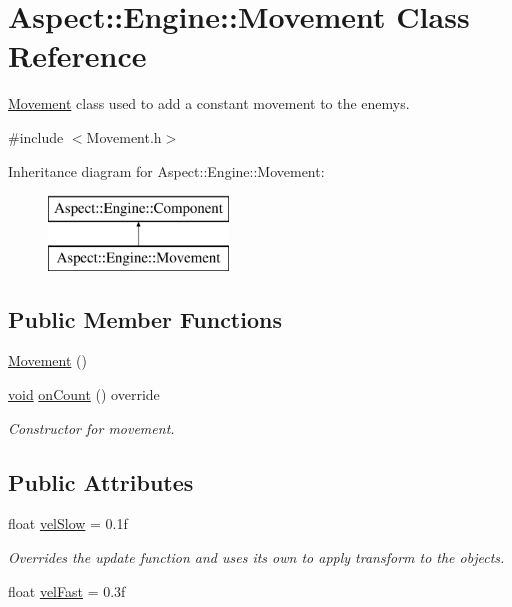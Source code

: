 \hypertarget{class_aspect_1_1_engine_1_1_movement}{}\section{Aspect\+:\+:Engine\+:\+:Movement Class Reference}
\label{class_aspect_1_1_engine_1_1_movement}


\mbox{\hyperlink{class_aspect_1_1_engine_1_1_movement}{Movement}} class used to add a constant movement to the enemys.  




{\ttfamily \#include $<$Movement.\+h$>$}

Inheritance diagram for Aspect\+:\+:Engine\+:\+:Movement\+:\begin{figure}[H]
\begin{center}
\leavevmode
\includegraphics[height=2.000000cm]{class_aspect_1_1_engine_1_1_movement}
\end{center}
\end{figure}
\subsection*{Public Member Functions}
\begin{DoxyCompactItemize}
\item 
\mbox{\hyperlink{class_aspect_1_1_engine_1_1_movement_a34fbf2e93e913d47b7f27fa51f5c312e}{Movement}} ()
\item 
\mbox{\hyperlink{_s_d_l__opengles2__gl2ext_8h_ae5d8fa23ad07c48bb609509eae494c95}{void}} \mbox{\hyperlink{class_aspect_1_1_engine_1_1_movement_a4dc9ec0157d8d24dafeb69c3c3f60e23}{on\+Count}} () override
\begin{DoxyCompactList}\small\item\em Constructor for movement. \end{DoxyCompactList}\end{DoxyCompactItemize}
\subsection*{Public Attributes}
\begin{DoxyCompactItemize}
\item 
float \mbox{\hyperlink{class_aspect_1_1_engine_1_1_movement_af7975b02666fc826c7d57193d2230c77}{vel\+Slow}} = 0.\+1f
\begin{DoxyCompactList}\small\item\em Overrides the update function and uses its own to apply transform to the objects. \end{DoxyCompactList}\item 
float \mbox{\hyperlink{class_aspect_1_1_engine_1_1_movement_a6e8ca164020a989058d53a4b0d735baf}{vel\+Fast}} = 0.\+3f
\end{DoxyCompactItemize}


